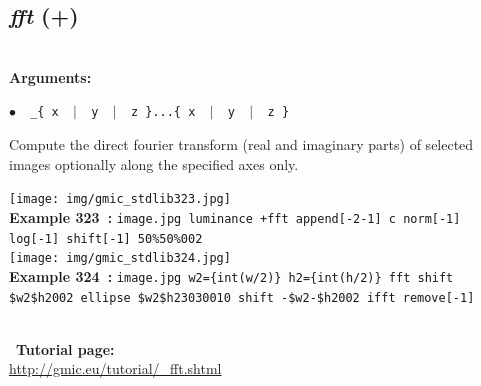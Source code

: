 \documentclass[a4paper,10.5pt,twoside]{book}
\def\comma{\discretionary{,}{}{,}}
\newcommand{\Cb}[1]{\textcolor{cb}{#1}}
\begin{document}
\subsection{\emph{fft} (+)}\vspace*{-0.7em}
~\\\textbf{\Cb{Arguments: }}\begin{flushleft}
{\small \Cb{\hspace*{0.5cm}$\bullet$~~\texttt{\_\{ x ~$|$~ y ~$|$~ z \}...\{ x ~$|$~ y ~$|$~ z \}}}}\end{flushleft}
Compute the direct fourier transform (real and imaginary parts) of selected images{\comma}
optionally along the specified axes only.
\begin{center}\texttt{[image: img/gmic\_stdlib323.jpg]}\\
{\footnotesize \textbf{Example 323~:} \texttt{image.jpg luminance +fft append[-2{\comma}-1] c norm[-1] log[-1] shift[-1] 50\%{\comma}50\%{\comma}0{\comma}0{\comma}2}}
\\\texttt{[image: img/gmic\_stdlib324.jpg]}\\
{\footnotesize \textbf{Example 324~:} \texttt{image.jpg w2=\{int(w/2)\} h2=\{int(h/2)\} fft shift \$w2{\comma}\$h2{\comma}0{\comma}0{\comma}2 ellipse \$w2{\comma}\$h2{\comma}30{\comma}30{\comma}0{\comma}1{\comma}0 shift -\$w2{\comma}-\$h2{\comma}0{\comma}0{\comma}2 ifft remove[-1]}}
\end{center}
~\\
~\textbf{Tutorial page: }\\\url{http://gmic.eu/tutorial/\_fft.shtml}
\end{document}
